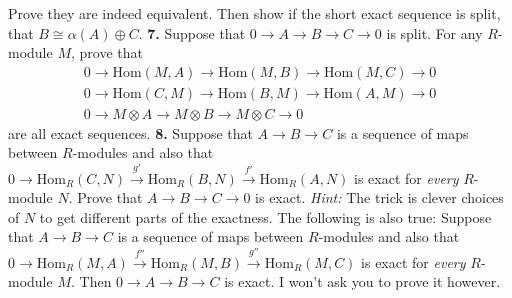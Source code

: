 \documentclass[11pt]{amsart}
\renewcommand{\to}[1][]{\xrightarrow{\ #1\ }}
\newcommand{\Hom}{\mathrm{Hom}}
\begin{document}
Prove they are indeed equivalent.  Then show if the short exact sequence is split, that $B \cong \alpha(A) \oplus C$.
\newpage
\noindent
{\bf 7.}  Suppose that $0 \to A \to B \to C \to 0$ is split.  For any $R$-module $M$, prove that
\[
    \begin{array}{c}
        0 \to \Hom(M, A) \to \Hom(M, B) \to \Hom(M, C) \to 0\\
        0 \to \Hom(C, M) \to \Hom(B, M) \to \Hom(A, M) \to 0\\
        0 \to M \otimes A \to M \otimes B \to M \otimes C \to 0
    \end{array}
\]
are all exact sequences.
\newpage
\noindent
{\bf 8.}  Suppose that $A \to B \to C$ is a sequence of maps between $R$-modules and also that $0 \to \Hom_R(C, N) \xrightarrow{g'} \Hom_R(B, N) \xrightarrow{f'} \Hom_R(A, N)$ is exact for \emph{every} $R$-module $N$.  Prove that $A \to B \to C \to 0$ is exact.
\vskip 3pt
\emph{Hint:} The trick is clever choices of $N$ to get different parts of the exactness.
\vfill
The following is also true:  Suppose that $A \to B \to C$ is a sequence of maps between $R$-modules and also that $0 \to \Hom_R(M, A) \xrightarrow{f''} \Hom_R(M, B) \xrightarrow{g''} \Hom_R(M, C)$ is exact for \emph{every} $R$-module $M$.  Then $0 \to A \to B \to C$ is exact.  I won't ask you to prove it however.
\end{document}
